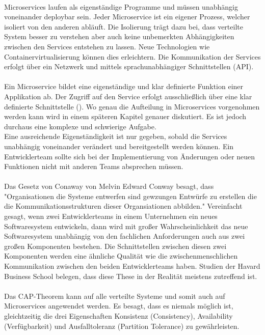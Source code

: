 \\
Microservices laufen als eigenständige Programme und müssen unabhängig voneinander deploybar sein. Jeder Microservice ist ein eigener Prozess, welcher isoliert von den anderen abläuft. Die Isolierung trägt dazu bei, dass verteilte System besser zu verstehen aber auch keine unbemerkten Abhängigkeiten zwischen den Services entstehen zu lassen. Neue Technologien wie Containervirtualisierung können dies erleichtern. Die Kommunikation der Services erfolgt über ein Netzwerk und mittels sprachunabhängiger Schnittstellen (API). \\
\\
Ein Microservice bildet eine eigenständige und klar definierte Funktion einer Applikation ab. Der Zugriff auf den Service erfolgt ausschließlich über eine klar definierte Schnittstelle (\cite[S. 64]{trempArchitekturen2021}). Wo genau die Aufteilung in Microservices vorgenohmen werden kann wird in einem späteren Kapitel genauer diskutiert. Es ist jedoch durchaus eine komplexe und schwierige Aufgabe.
\\
Eine ausreichende Eigenständigkeit ist nur gegeben, sobald die Services unabhängig voneinander verändert und bereitgestellt werden können. Ein Entwicklerteam sollte sich bei der Implementierung von Änderungen oder neuen Funktionen nicht mit anderen Teams absprechen müssen. \\
\\
Das Gesetz von Conaway von Melvin Edward Conway besagt, dass "Organisationen die Systeme entwerfen sind gewzungen Entwürfe zu erstellen die die Kommunikationsstrukturen dieser Organsiationen abbilden." Vereinfacht gesagt, wenn zwei Entwicklerteams in einem Unternehmen ein neues Softwaresystem entwickeln, dann wird mit großer Wahrscheinlichkeit das neue Softwaresystem unabhängig von den fachlichen Anforderungen auch aus zwei großen Komponenten bestehen. Die Schnittstellen zwischen diesen zwei Komponenten werden eine ähnliche Qualität wie die zwischenmenschlichen Kommunikation zwischen den beiden Entwicklerteams haben. Studien der Havard Business School belegen, dass diese These in der Realität meistens zutreffend ist.  \\
\\
Das CAP-Theorem kann auf alle verteilte Systeme und somit auch auf Microservices angewendet werden. Es besagt, dass es niemals möglich ist, gleichtzeitig die drei Eigenschaften Konsistenz (Consistency), Availability (Verfügbarkeit) und Ausfalltoleranz (Partition Tolerance) zu gewährleisten.

